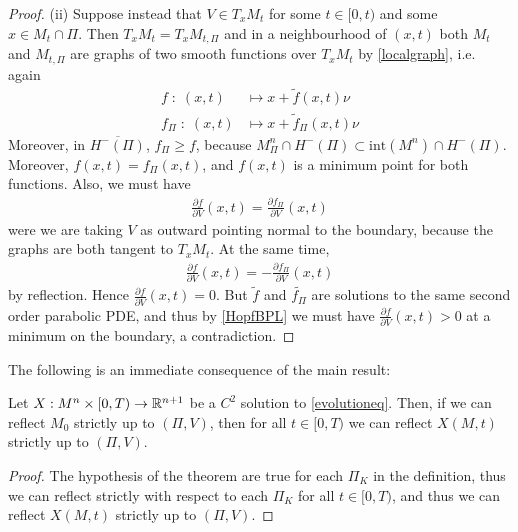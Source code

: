\begin{proof}
	(ii) Suppose instead that $V\in T_xM_t$  for some $t\in [0, t)$ and some $x\in M_t\cap \Pi$. Then $T_xM_t= T_xM_{t, \Pi}$ and in a neighbourhood of $(x, t)$ both $M_t$ and $M_{t, \Pi}$ are graphs of two smooth functions over $T_xM_t$ by \ref{localgraph}, i.e. again
	\begin{align*}
		f \; : \; (x, t) &\mapsto x+\tilde{f}(x, t)\nu \\
		f_\Pi \; : \; (x, t) &\mapsto x+\tilde{f}_\Pi(x, t)\nu 
	\end{align*} 
	Moreover, in $\overline{H^-(\Pi)}$, $f_\Pi\geq f$, because $M^n_\Pi\cap H^-(\Pi)\subset \mathrm{int}(M^n)\cap H^-(\Pi)$. Moreover, $f(x, t)=f_\Pi (x, t)$, and $f(x, t)$ is a minimum point for both functions. Also, we must have 
	\begin{align*}
		\frac{\partial f}{\partial V}(x,t)=\frac{\partial f_\Pi}{\partial V}(x,t)
	\end{align*}
	were we are taking $V$ as outward pointing normal to the boundary, because the graphs are both tangent to $T_xM_t$. At the same time, 
	\begin{align*}
		\frac{\partial f}{\partial V}(x,t)=-\frac{\partial f_\Pi}{\partial V}(x,t)
	\end{align*}
	by reflection. Hence $\frac{\partial f}{\partial V}(x,t)=0$. But $\tilde{f}$ and $\tilde{f_\Pi}$ are solutions to the same second order parabolic PDE, and thus by \ref{HopfBPL} we must have $\frac{\partial f}{\partial V}(x,t)>0$ at a minimum on the boundary, a contradiction.  
\end{proof}
The following is an immediate consequence of the main result:
\begin{cor}
	Let $X:M^n\times [0,T) \rightarrow \mathbb{R}^{n+1}$ be a $C^2$ solution to \ref{evolutioneq}. Then, if we can reflect $M_0$ strictly up to $(\Pi, V)$, then for all $t\in [0,T)$ we can reflect $X(M, t)$ strictly up to $(\Pi, V)$.  
\end{cor}
\begin{proof}
	The hypothesis of the theorem are true for each $\Pi_K$ in the definition, thus we can reflect strictly with respect to each $\Pi_K$ for all $t\in[0,T)$, and thus we can reflect $X(M, t)$ strictly up to $(\Pi, V)$.
\end{proof}
